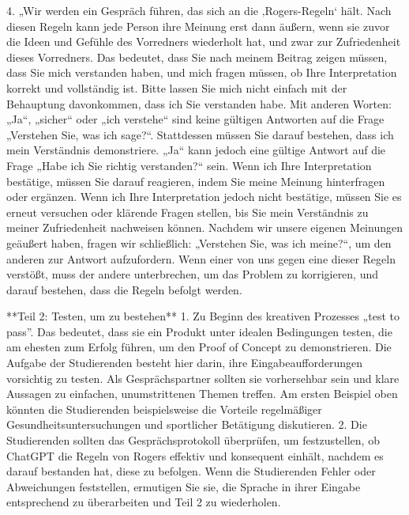 \documentclass[
  ngerman,
  letterpaper,
  DIV=11]{scrreprt}
\newenvironment{Shaded}{\begin{snugshade}}{\end{snugshade}}
\newcommand{\NormalTok}[1]{\textcolor[rgb]{0.00,0.23,0.31}{#1}}
\newcommand{\SpecialStringTok}[1]{\textcolor[rgb]{0.13,0.47,0.30}{#1}}
\begin{document}
\begin{tcolorbox}
\begin{Shaded}
\begin{Highlighting}[]
\SpecialStringTok{4.  }\NormalTok{„Wir werden ein Gespräch führen, das sich an die ‚Rogers{-}Regeln‘ hält. Nach diesen Regeln kann jede Person ihre Meinung erst dann äußern, wenn sie zuvor die Ideen und Gefühle des Vorredners wiederholt hat, und zwar zur Zufriedenheit dieses Vorredners. Das bedeutet, dass Sie nach meinem Beitrag zeigen müssen, dass Sie mich verstanden haben, und mich fragen müssen, ob Ihre Interpretation korrekt und vollständig ist. Bitte lassen Sie mich nicht einfach mit der Behauptung davonkommen, dass ich Sie verstanden habe. Mit anderen Worten: „Ja“, „sicher“ oder „ich verstehe“ sind keine gültigen Antworten auf die Frage „Verstehen Sie, was ich sage?“. Stattdessen müssen Sie darauf bestehen, dass ich mein Verständnis demonstriere. „Ja“ kann jedoch eine gültige Antwort auf die Frage „Habe ich Sie richtig verstanden?“ sein. Wenn ich Ihre Interpretation bestätige, müssen Sie darauf reagieren, indem Sie meine Meinung hinterfragen oder ergänzen. Wenn ich Ihre Interpretation jedoch nicht bestätige, müssen Sie es erneut versuchen oder klärende Fragen stellen, bis Sie mein Verständnis zu meiner Zufriedenheit nachweisen können. Nachdem wir unsere eigenen Meinungen geäußert haben, fragen wir schließlich: „Verstehen Sie, was ich meine?“, um den anderen zur Antwort aufzufordern. Wenn einer von uns gegen eine dieser Regeln verstößt, muss der andere unterbrechen, um das Problem zu korrigieren, und darauf bestehen, dass die Regeln befolgt werden.}

\NormalTok{**Teil 2: Testen, um zu bestehen**}
\SpecialStringTok{1.  }\NormalTok{Zu Beginn des kreativen Prozesses „test to pass”. Das bedeutet, dass sie ein Produkt unter idealen Bedingungen testen, die am ehesten zum Erfolg führen, um den Proof of Concept zu demonstrieren. Die Aufgabe der Studierenden besteht hier darin, ihre Eingabeaufforderungen vorsichtig zu testen. Als Gesprächspartner sollten sie vorhersehbar sein und klare Aussagen zu einfachen, unumstrittenen Themen treffen. Am ersten Beispiel oben könnten die Studierenden beispielsweise die Vorteile regelmäßiger Gesundheitsuntersuchungen und sportlicher Betätigung diskutieren.}
\SpecialStringTok{2.  }\NormalTok{Die Studierenden sollten das Gesprächsprotokoll überprüfen, um festzustellen, ob ChatGPT die Regeln von Rogers effektiv und konsequent einhält, nachdem es darauf bestanden hat, diese zu befolgen. Wenn die Studierenden Fehler oder Abweichungen feststellen, ermutigen Sie sie, die Sprache in ihrer Eingabe entsprechend zu überarbeiten und Teil 2 zu wiederholen.}


\end{Highlighting}
\end{Shaded}
\end{tcolorbox}
\end{document}
